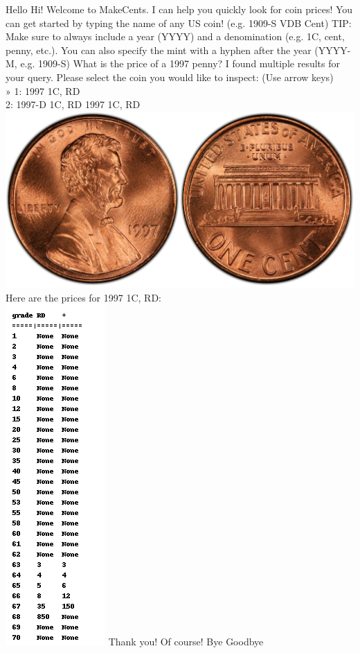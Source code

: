 \documentclass[11pt,a4paper]{article}
\begin{document}
\begin{dialogue}
     Hello
     Hi! Welcome to MakeCents. I can help you quickly look for coin prices!
     You can get started by typing the name of any US coin! (e.g. 1909-S VDB Cent)
     TIP: Make sure to always include a year (YYYY) and a denomination (e.g. 1C, cent, penny, etc.). You can also specify the mint with a hyphen after the year (YYYY-M, e.g. 1909-S)
     What is the price of a 1997 penny?
     I found multiple results for your query.
     Please select the coin you would like to inspect:   (Use arrow keys) \\» 1: 1997 1C, RD \\\phantom{» }2: 1997-D 1C, RD
    1997 1C, RD
     \phantom{placeholder} \\ \includegraphics[scale=0.075]{images/19971c.jpg}\\ Here are the prices for 1997 1C, RD: \\
    \includegraphics[scale=0.6]{images/price_table.png}
     Thank you!
     Of course!
     Bye
     Goodbye

\end{dialogue}
\end{document}
